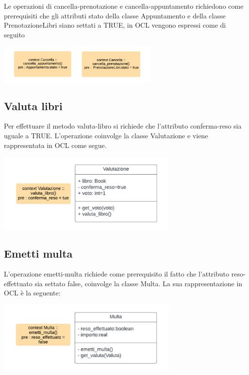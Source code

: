 \documentclass{article}
\begin{document}
Le operazioni di cancella-prenotazione e cancella-appuntamento richiedono come prerequisiti che gli attributi stato della classe Appuntamento e della classe PrenotazioneLibri siano settati a TRUE, in OCL vengono espressi come di seguito
\begin{center}
        \includegraphics[width=80mm]{D3/Images/OCL_canc_pren_app.jpg}
\end{center}

\subsection{Valuta libri} 
Per effettuare il metodo valuta-libro si richiede che l’attributo conferma-reso sia uguale a TRUE. L’operazione coinvolge la classe Valutazione e viene rappresentata in OCL come segue.
\begin{center}
        \includegraphics[width=90mm]{D3/Images/ValutazioneOCL.jpg}
\end{center}

\subsection{Emetti multa}
L’operazione emetti-multa richiede come prerequisito il fatto che l’attributo reso-effettuato sia settato false, coinvolge la classe Multa. La sua rappresentazione in OCL è la seguente:
\begin{center}
        \includegraphics[width=90mm]{D3/Images/MultaOCL.jpg}
\end{center}
\end{document}
